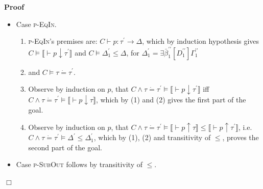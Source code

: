 \documentclass{article}
\newcommand{\tmname}[1]{\textsc{#1}}
\newcommand{\tmop}[1]{\ensuremath{\operatorname{#1}}}
\newenvironment{proof}{\noindent\textbf{Proof\ }}{\hspace*{\fill}$\Box$\medskip}
\begin{document}
\begin{proof}
\begin{itemize}
\begin{enumerate}
      \item Observe, that $\Gamma^{\prime\prime} \dot{=} \Gamma^{\prime}
      \equiv \wedge_i (\Gamma_i^{\prime\prime} \dot{=} \Gamma_i^{\prime})$ and
      $D^{\prime} = D_0 \wedge_i D_i^{\prime}$. (10) and (11) imply
      \[ C \vDash \forall \bar{\beta}^{\prime\prime} . \bar{\beta}_0 \dot{=}
         \bar{\beta}_0^{\prime} \wedge D^{\prime\prime} \Rightarrow \exists
         \bar{\beta}_1^{\prime} \ldots \bar{\beta}_n^{\prime} .D^{\prime}
         \wedge \Gamma^{\prime\prime} \dot{=} \Gamma^{\prime} \]
      \item Also, $\bar{\beta}^{\prime} = \bar{\beta}_0 \bar{\beta}_1^{\prime}
      \ldots \bar{\beta}_n^{\prime}$. Because $\bar{\beta}_0 \# \tmop{FV}
      (D^{\prime\prime})$, because sorts are nonempty (12) gives $C \vDash
      \forall \bar{\beta}^{\prime\prime} . \bar{\alpha}_0 \dot{=}
      \bar{\alpha}_0^{\prime} \wedge D^{\prime\prime} \Rightarrow \exists
      \bar{\beta}^{\prime} .D^{\prime} \wedge \Gamma^{\prime\prime} \dot{=}
      \Gamma^{\prime}$, the other part of the goal.
    \end{enumerate}
    \item Case {\tmname{p-EqIn}}.
    \begin{enumerate}
      \item {\tmname{p-EqIn}}'s premises are: $C \vdash p : \tau^{\prime}
      \longrightarrow \Delta$, which by induction hypothesis gives $C \vDash
      \llbracket \vdash p \downarrow \tau^{\prime} \rrbracket$ and $C \vDash
      \Delta^{\prime}_1 \leqslant \Delta$, for $\Delta_1^{\prime} = \exists
      \bar{\beta}_1^{\prime\prime} [D_1^{\prime\prime}]
      \Gamma_1^{\prime\prime}$
      
      \item and $C \vDash \tau \dot{=} \tau^{\prime}$.
      
      \item Observe by induction on $p$, that $C \wedge \tau \dot{=}
      \tau^{\prime} \vDash \llbracket \vdash p \downarrow \tau^{\prime}
      \rrbracket$ iff $C \wedge \tau \dot{=} \tau^{\prime} \vDash \llbracket
      \vdash p \downarrow \tau \rrbracket$, which by (1) and (2) gives the
      first part of the goal.
      
      \item Observe by induction on $p$, that $C \wedge \tau \dot{=}
      \tau^{\prime} \vDash \llbracket \vdash p \uparrow \tau \rrbracket
      \leqslant \llbracket \vdash p \uparrow \tau^{\prime} \rrbracket$, i.e.
      $C \wedge \tau \dot{=} \tau^{\prime} \vDash \Delta^{\prime} \leqslant
      \Delta^{\prime}_1$, which by (1), (2) and transitivity of $\leqslant$,
      proves the second part of the goal.
    \end{enumerate}
    \item Case {\tmname{p-SubOut}} follows by transitivity of $\leqslant$.
    

\end{itemize}
\end{proof}
\end{document}
